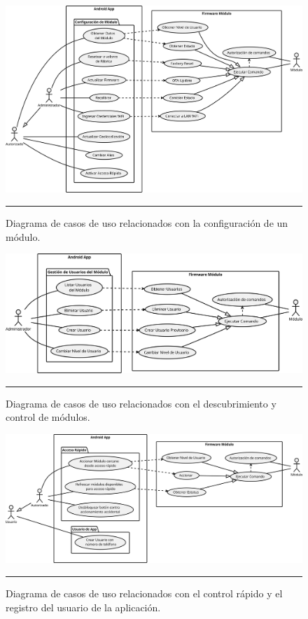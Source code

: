 \begin{figure}[htbp]
	\centering
	\includegraphics[width=\textwidth]{Figures/reque/USE_config.png}
	\rule{35em}{1pt}
	\caption[Diagrama de Casos de Uso]{Diagrama de casos de uso relacionados con la configuración de un módulo.}
	\label{fig:uso_config}
\end{figure}

\begin{figure}[htbp]
	\centering
	\includegraphics[width=\textwidth]{Figures/reque/USE_usuarios.png}
	\rule{35em}{1pt}
	\caption[Diagrama de Casos de Uso]{Diagrama de casos de uso relacionados con el descubrimiento y control de módulos.}
	\label{fig:uso_usuarios}
\end{figure}

\begin{figure}[htbp]
	\centering
	\includegraphics[width=\textwidth]{Figures/reque/USE_rapido.png}
	\rule{35em}{1pt}
	\caption[Diagrama de Casos de Uso]{Diagrama de casos de uso relacionados con el control rápido y el registro del usuario de la aplicación.}
	\label{fig:uso_rapido}
\end{figure}

